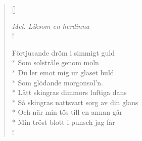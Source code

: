 
\settowidth{\versewidth}{Förtjusande dröm i simmigt guld}



\begin{verse}[\versewidth]

\flagverse{}
\emph{Mel. Liksom en herdinna}\\!


Förtjusande dröm i simmigt guld\\*
Som solstråle genom moln\\*
Du ler emot mig ur glaset huld\\*
Som glödande morgonsol'n.\\*
Lätt skingras dimmors luftiga dans\\*
Så skingras nattsvart sorg av din glans\\*
Och när min tös till en annan går\\*
Min tröst blott i punsch jag får\\!


\end{verse}

